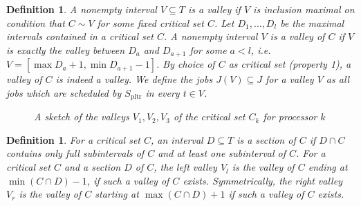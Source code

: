 \documentclass[a4paper]{article}
\DeclareMathOperator{\pltr}{pltr}
\DeclareMathOperator{\crit}{crit}
\newtheorem{definition}[theorem]{Definition}
\begin{document}
\begin{definition}
A nonempty interval $V \subseteq T$ is a \emph{valley} if $V$ is inclusion maximal on condition that $C \sim V$ for some fixed critical set $C$.
Let $D_1, \ldots, D_l$ be the maximal intervals contained in a critical set $C$.
A nonempty interval $V$ is a \emph{valley of $C$} if $V$ is exactly the valley between $D_{a}$ and $D_{a+1}$ for some $a < l$, i.e. $V = [\max D_a + 1, \min D_{a+1} - 1]$.
By choice of $C$ as critical set (property 1), a valley of $C$ is indeed a valley.
We define the jobs $J(V) \subseteq J$ for a valley $V$ as all jobs which are scheduled by $S_{\pltr}$ in every $t \in V$.
\begin{figure}[H]
  \centering
  
  \caption{A sketch of the valleys $V_1, V_2, V_3$ of the critical set $C_k$ for processor $k$}\label{fig:valleys_of}
\end{figure}
\end{definition}
\begin{definition}
  For a critical set $C$, an interval $D \subseteq T$ \emph{is a section of} $C$ if $D \cap C$ contains only full subintervals of $C$ and at least one subinterval of $C$.
  For a critical set $C$ and a section $D$ of $C$, the \emph{left valley} $V_l$ is the valley of $C$ ending at $\min (C \cap D) - 1$, if such a valley of $C$ exists.
  Symmetrically, the \emph{right valley} $V_r$ is the valley of $C$ starting at $\max (C \cap D) + 1$ if such a valley of $C$ exists.
\end{definition}
\end{document}
